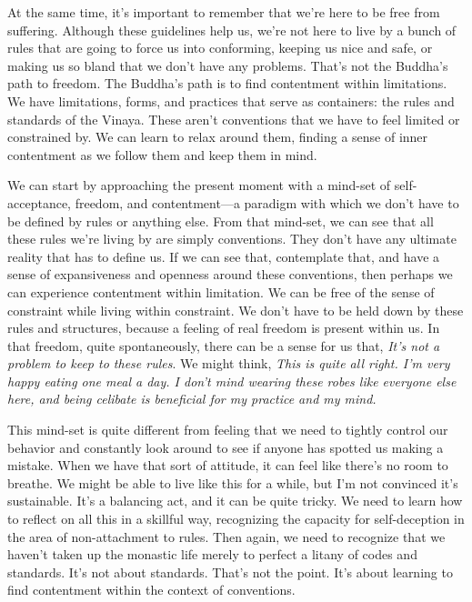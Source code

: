 At the same time, it's important to remember that we're here to be free 
from suffering. Although these guidelines help us, we're not here to 
live by a bunch of rules that are going to force us into conforming, 
keeping us nice and safe, or making us so bland that we don't have any 
problems. That's not the Buddha's path to freedom. The Buddha's path is 
to find contentment within limitations. We have limitations, forms, and 
practices that serve as containers: the rules and standards of the 
Vinaya. These aren't conventions that we have to feel limited or 
constrained by. We can learn to relax around them, finding a sense of 
inner contentment as we follow them and keep them in mind.

We can start by approaching the present moment with a mind-set of 
self-acceptance, freedom, and contentment---a paradigm with which we 
don't have to be defined by rules or anything else. From that mind-set, 
we can see that all these rules we're living by are simply conventions. 
They don't have any ultimate reality that has to define us. If we can 
see that, contemplate that, and have a sense of expansiveness and 
openness around these conventions, then perhaps we can experience 
contentment within limitation. We can be free of the sense of 
constraint while living within constraint. We don't have to be held 
down by these rules and structures, because a feeling of real freedom 
is present within us. In that freedom, quite spontaneously, there can 
be a sense for us that, \emph{It's not a problem to keep to these 
rules}. We might think, \emph{This is quite all right. I'm very happy 
eating one meal a day. I don't mind wearing these robes like everyone 
else here, and being celibate is beneficial for my practice and my 
mind.}

This mind-set is quite different from feeling that we need to tightly 
control our behavior and constantly look around to see if anyone has 
spotted us making a mistake. When we have that sort of attitude, it can 
feel like there's no room to breathe. We might be able to live like 
this for a while, but I'm not convinced it's sustainable. It's a 
balancing act, and it can be quite tricky. We need to learn how to 
reflect on all this in a skillful way, recognizing the capacity for 
self-deception in the area of non-attachment to rules. Then again, we 
need to recognize that we haven't taken up the monastic life merely to 
perfect a litany of codes and standards. It's not about standards. 
That's not the point. It's about learning to find contentment within 
the context of conventions.

